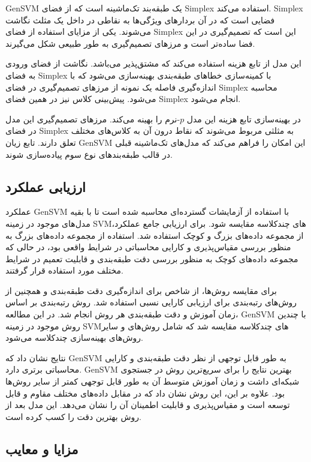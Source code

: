 \documentclass{article}
\begin{document}
GenSVM یک طبقه‌بند تک‌ماشینه است که از فضای 
Simplex
 استفاده می‌کند. 
 Simplex
  فضایی است که در آن بردارهای ویژگی‌ها به نقاطی در داخل یک مثلث نگاشت می‌شوند. یکی از مزایای استفاده از فضای 
  Simplex
   این است که تصمیم‌گیری در این فضا ساده‌تر است و مرزهای تصمیم‌گیری به طور طبیعی شکل می‌گیرند. 

این مدل از تابع هزینه
استفاده می‌کند که مشتق‌پذیر می‌باشد. نگاشت از فضای ورودی به فضای 
Simplex
 با کمینه‌سازی خطاهای طبقه‌بندی بهینه‌سازی می‌شود که با اندازه‌گیری فاصله یک نمونه از مرزهای تصمیم‌گیری در فضای 
 Simplex
  محاسبه می‌شود. پیش‌بینی کلاس نیز در همین فضای 
  Simplex
   انجام می‌شود.

در بهینه‌سازی تابع هزینه این مدل 
$p$-نرم
را بهینه می‌کند. مرزهای تصمیم‌گیری این مدل در فضای 
Simplex
 به مثلثی مربوط می‌شوند که نقاط درون آن به کلاس‌های مختلف تعلق دارند. تابع زیان GenSVM این امکان را فراهم می‌کند که مدل‌های تک‌ماشینه قبلی در قالب طبقه‌بندهای نوع سوم پیاده‌سازی شوند.

\subsection{ارزیابی عملکرد}

عملکرد GenSVM با استفاده از آزمایشات گسترده‌ای محاسبه شده است تا با بقیه مدل‌های موجود در زمینه SVMهای چندکلاسه مقایسه شود. برای ارزیابی جامع عملکرد، از مجموعه داده‌های بزرگ و کوچک استفاده شد. استفاده از مجموعه داده‌های بزرگ به منظور بررسی مقیاس‌پذیری و کارایی محاسباتی در شرایط واقعی بود، در حالی که مجموعه داده‌های کوچک به منظور بررسی دقت طبقه‌بندی و قابلیت تعمیم در شرایط مختلف مورد استفاده قرار گرفتند.

برای مقایسه روش‌ها، از شاخص
برای اندازه‌گیری دقت طبقه‌بندی و همچنین از روش‌های رتبه‌بندی برای ارزیابی کارایی نسبی استفاده شد. روش رتبه‌بندی بر اساس زمان آموزش و دقت طبقه‌بندی هر روش انجام شد. در این مطالعه، GenSVM با چندین روش موجود در زمینه SVMهای چندکلاسه مقایسه شد که شامل روش‌های
و سایر روش‌های بهینه‌سازی چندکلاسه می‌شود.

نتایج نشان داد که GenSVM به طور قابل توجهی از نظر دقت طبقه‌بندی و کارایی محاسباتی برتری دارد. GenSVM بهترین نتایج را برای سریع‌ترین روش در جستجوی شبکه‌ای داشت و زمان آموزش متوسط آن به طور قابل توجهی کمتر از سایر روش‌ها بود. علاوه بر این، این روش نشان داد که در مقابل داده‌های مختلف مقاوم و قابل توسعه است و مقیاس‌پذیری و قابلیت اطمینان آن را نشان می‌دهد. این مدل بعد از روش
بهترین دقت را کسب کرده است.

\subsection{مزایا و معایب}
\end{document}
